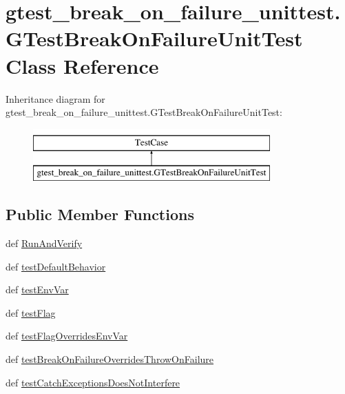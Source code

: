\hypertarget{classgtest__break__on__failure__unittest_1_1_g_test_break_on_failure_unit_test}{\section{gtest\-\_\-break\-\_\-on\-\_\-failure\-\_\-unittest.\-G\-Test\-Break\-On\-Failure\-Unit\-Test Class Reference}
\label{classgtest__break__on__failure__unittest_1_1_g_test_break_on_failure_unit_test}
}
Inheritance diagram for gtest\-\_\-break\-\_\-on\-\_\-failure\-\_\-unittest.\-G\-Test\-Break\-On\-Failure\-Unit\-Test\-:\begin{figure}[H]
\begin{center}
\leavevmode
\includegraphics[height=2.000000cm]{classgtest__break__on__failure__unittest_1_1_g_test_break_on_failure_unit_test}
\end{center}
\end{figure}
\subsection*{Public Member Functions}
\begin{DoxyCompactItemize}
\item 
def \hyperlink{classgtest__break__on__failure__unittest_1_1_g_test_break_on_failure_unit_test_a755640c8f1304e7c59c367b019900b56}{Run\-And\-Verify}
\item 
def \hyperlink{classgtest__break__on__failure__unittest_1_1_g_test_break_on_failure_unit_test_a75a3a3a048d333d71c6fbc61bea5dc6d}{test\-Default\-Behavior}
\item 
def \hyperlink{classgtest__break__on__failure__unittest_1_1_g_test_break_on_failure_unit_test_ad941026c6cc28c4adf89f9daeeec9787}{test\-Env\-Var}
\item 
def \hyperlink{classgtest__break__on__failure__unittest_1_1_g_test_break_on_failure_unit_test_a7f7cedd991c6efe50678d5afe46271d7}{test\-Flag}
\item 
def \hyperlink{classgtest__break__on__failure__unittest_1_1_g_test_break_on_failure_unit_test_a6fa7456806eae78661a3ae8279418884}{test\-Flag\-Overrides\-Env\-Var}
\item 
def \hyperlink{classgtest__break__on__failure__unittest_1_1_g_test_break_on_failure_unit_test_a172b21a0764125d322b52fa210ec4a8c}{test\-Break\-On\-Failure\-Overrides\-Throw\-On\-Failure}
\item 
def \hyperlink{classgtest__break__on__failure__unittest_1_1_g_test_break_on_failure_unit_test_a3ab04c033dca973ed2c35255a730aa65}{test\-Catch\-Exceptions\-Does\-Not\-Interfere}
\end{DoxyCompactItemize}


